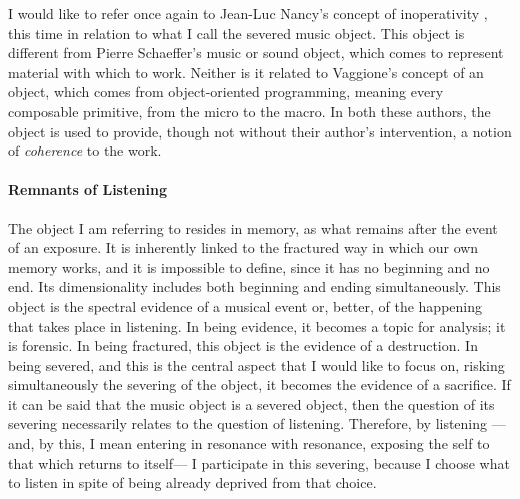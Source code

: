 I would like to refer once again to Jean-Luc Nancy's concept of inoperativity , this time in relation to what I call the severed music object. This object is different from Pierre Schaeffer's music or sound object, which comes to represent material with which to work. Neither is it related to Vaggione's concept of an object, which comes from object-oriented programming, meaning every composable primitive, from the micro to the macro. In both these authors, the object is used to provide, though not without their author's intervention, a notion of \textit{coherence} to the work. 

\paragraph{Remnants of Listening}
The object I am referring to resides in memory, as what remains after the event of an exposure. It is inherently linked to the fractured way in which our own memory works, and it is impossible to define, since it has no beginning and no end. Its dimensionality includes both beginning and ending simultaneously. This object is the spectral evidence of a musical event or, better, of the happening that takes place in listening. In being evidence, it becomes a topic for analysis; it is forensic. In being fractured, this object is the evidence of a destruction. In being severed, and this is the central aspect that I would like to focus on, risking simultaneously the severing of the object, it becomes the evidence of a sacrifice. If it can be said that the music object is a severed object, then the question of its severing necessarily relates to the question of listening. Therefore, by listening ---and, by this, I mean entering in resonance with resonance, exposing the self to that which returns to itself--- I participate in this severing, because I choose what to listen in spite of being already deprived from that choice.

